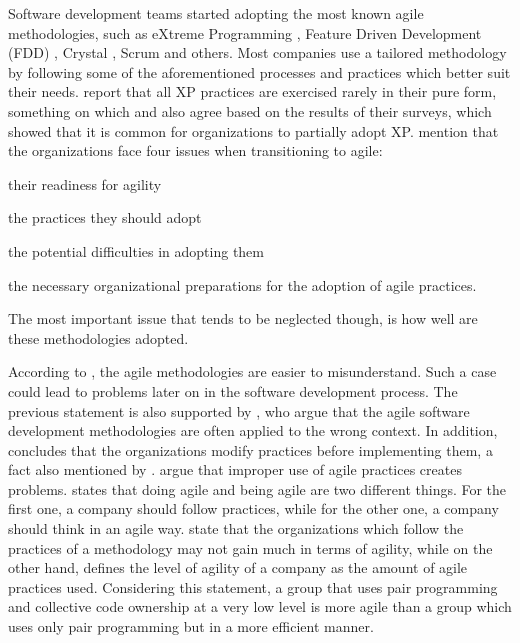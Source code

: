 Software development teams started adopting the most known agile methodologies, such as eXtreme Programming \cite{Beck:2004:EPE:1076267}, Feature Driven Development (FDD) \cite{Palmer:2001:PGF:600044}, Crystal \cite{Cockburn:2004:CCH:1406822}, Scrum \cite{scrum} and others. Most companies use a tailored methodology by following some of the aforementioned processes and practices which better suit their needs. \citet{williams2004toward} report that all XP practices are exercised rarely in their pure form, something on which \citet{Reifer} and \citet{aveling} also agree based on the results of their surveys, which showed that it is common for organizations to partially adopt XP. \citet{sidky} mention that the organizations face four issues when transitioning to agile:
\begin{inparaenum} [a\upshape)]
\item their readiness for agility
\item the practices they should adopt
\item the potential difficulties in adopting them
\item the necessary organizational preparations for the adoption of agile practices. 
\end{inparaenum}
The most important issue that tends to be neglected though, is how well are these methodologies adopted.

According to \citet{6427226}, the agile methodologies are easier to misunderstand. Such a case could lead to problems later on in the software development process. The previous statement is also supported by \citet{cefam}, who argue that the agile software development methodologies are often applied to the wrong context. In addition, \citet{1629340} concludes that the organizations modify practices before implementing them, a fact also mentioned by \citet{1579312}. \citet{hossain} argue that improper use of agile practices creates problems. \citet{sahota} states that doing agile and being agile are two different things. For the first one, a company should follow practices, while for the other one, a company should think in an agile way. \citet{lappoA04} state that the organizations which follow the practices of a methodology may not gain much in terms of agility, while on the other hand, \citet{sidky_dissertation} defines the level of agility of a company as the amount of agile practices used. Considering this statement, a group that uses pair programming and collective code ownership at a very low level is more agile than a group which uses only pair programming but in a more efficient manner.

